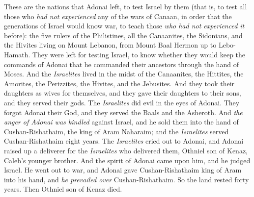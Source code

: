 \begin{biblechapter} %
 These are the nations that Adonai left, to test Israel by them (that is, to test all those who \textit{had not experienced} any of the wars of Canaan,
\verse in order that the generations of Israel would know war, to teach those \textit{who had not experienced it} before):
\verse the five rulers of the Philistines, all the Canaanites, the Sidonians, and the Hivites living on Mount Lebanon, from Mount Baal Hermon up to Lebo-Hamath.
\verse They were left for testing Israel, to know whether they would keep the commands of Adonai that he commanded their ancestors through the hand of Moses.
\verse And the \textit{Israelites} lived in the midst of the Canaanites, the Hittites, the Amorites, the Perizzites, the Hivites, and the Jebusites.
\verse And they took their daughters as wives for themselves, and they gave their daughters to their sons, and they served their gods.
 The \textit{Israelites} did evil in the eyes of Adonai. They forgot Adonai their God, and they served the Baals and the Asheroth.
\verse And \textit{the anger of Adonai was kindled} against Israel, and he sold them into the hand of Cushan-Rishathaim, the king of Aram Naharaim; and the \textit{Israelites} served Cushan-Rishathaim eight years.
\verse The \textit{Israelites} cried out to Adonai, and Adonai raised up a deliverer for the \textit{Israelites} who delivered them, Othniel son of Kenaz, Caleb’s younger brother.
\verse And the spirit of Adonai came upon him, and he judged Israel. He went out to war, and Adonai gave Cushan-Rishathaim king of Aram into his hand, and \textit{he prevailed over} Cushan-Rishathaim.
\verse So the land rested forty years. Then Othniel son of Kenaz died.

\end{biblechapter}
